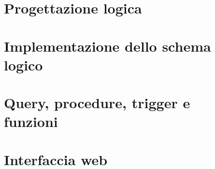 \documentclass[a4paper,twoside]{article}
\begin{document}
\section{Progettazione logica}

\section{Implementazione dello schema logico}

\section{Query, procedure, trigger e funzioni}

\section{Interfaccia web}
\end{document}
